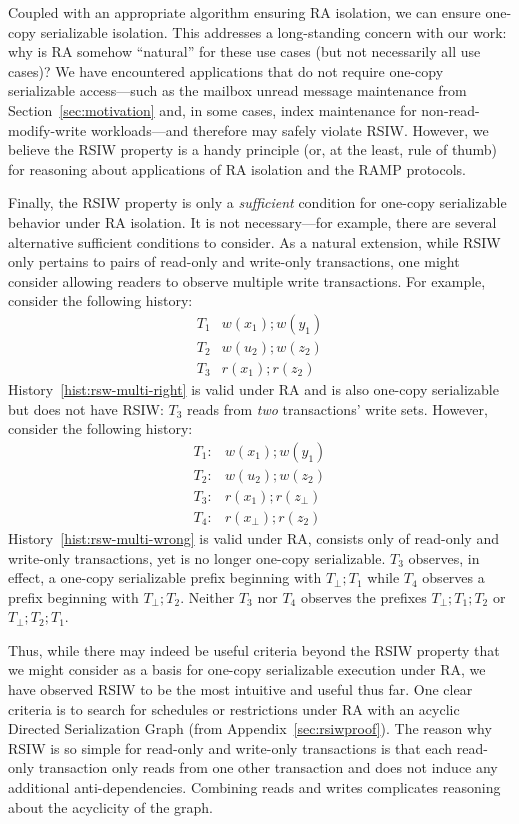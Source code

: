 Coupled with an appropriate algorithm ensuring RA isolation, we can
ensure one-copy serializable isolation. This addresses a long-standing
concern with our work: why is RA somehow ``natural'' for these use
cases (but not necessarily all use cases)?  We have encountered
applications that do not require one-copy serializable access---such
as the mailbox unread message maintenance from
Section~\ref{sec:motivation} and, in some cases, index maintenance for
non-read-modify-write workloads---and therefore may safely violate
RSIW. However, we believe the RSIW property is a handy principle (or,
at the least, rule of thumb) for reasoning about applications of RA
isolation and the RAMP protocols.

Finally, the RSIW property is only a \textit{sufficient} condition for
one-copy serializable behavior under RA isolation. It is not
necessary---for example, there are several alternative sufficient
conditions to consider. As a natural extension, while RSIW only
pertains to pairs of read-only and write-only transactions, one might
consider allowing readers to observe multiple write transactions. For
example, consider the following history:
\begin{eqnarray}
\label{hist:rsw-multi-right}
T_1 & w(x_1); w(y_1)\\
T_2 & w(u_2); w(z_2)\nonumber\\
T_3 & r(x_1); r(z_2)\nonumber
\end{eqnarray}
History~\ref{hist:rsw-multi-right} is valid under RA and is also
one-copy serializable but does not have RSIW: $T_3$ reads from
\textit{two} transactions' write sets. However, consider the following
history:
\begin{eqnarray}
\label{hist:rsw-multi-wrong}
T_1: & w(x_1); w(y_1)\\
T_2: & w(u_2); w(z_2)\nonumber\\
T_3: & r(x_1); r(z_\bot)\nonumber\\
T_4: & r(x_\bot); r(z_2)\nonumber
\end{eqnarray}
History~\ref{hist:rsw-multi-wrong} is valid under RA, consists only of
read-only and write-only transactions, yet is no longer
one-copy serializable. $T_3$ observes, in effect, a one-copy serializable prefix
beginning with $T_\bot; T_1$ while $T_4$ observes a prefix beginning
with $T_\bot; T_2$. Neither $T_3$ nor $T_4$ observes the prefixes
$T_\bot; T_1; T_2$ or $T_\bot; T_2; T_1$.

Thus, while there may indeed be useful criteria beyond the RSIW
property that we might consider as a basis for one-copy serializable
execution under RA, we have observed RSIW to be the most intuitive and
useful thus far. One clear criteria is to search for schedules or
restrictions under RA with an acyclic Directed Serialization Graph (from
Appendix~\ref{sec:rsiwproof}). The reason why RSIW is so simple for
read-only and write-only transactions is that each read-only
transaction only reads from one other transaction and does not induce
any additional anti-dependencies. Combining reads and writes
complicates reasoning about the acyclicity of the graph.

